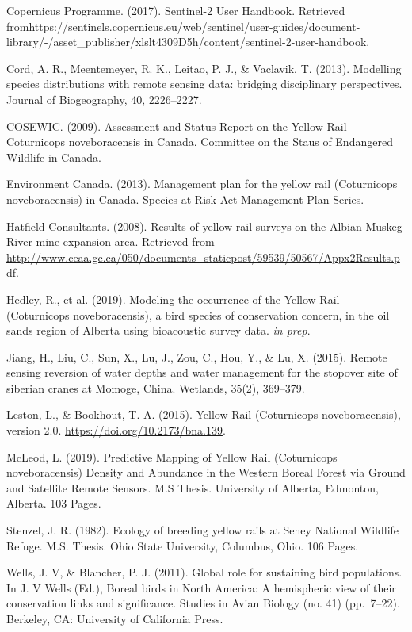 \documentclass[11pt,]{article}
\begin{document}
Copernicus Programme. (2017). Sentinel-2 User Handbook. Retrieved
fromhttps://sentinels.copernicus.eu/web/sentinel/user-guides/document-library/-/asset\_publisher/xlslt4309D5h/content/sentinel-2-user-handbook.

Cord, A. R., Meentemeyer, R. K., Leitao, P. J., \& Vaclavik, T. (2013).
Modelling species distributions with remote sensing data: bridging
disciplinary perspectives. Journal of Biogeography, 40, 2226--2227.

COSEWIC. (2009). Assessment and Status Report on the Yellow Rail
Coturnicops noveboracensis in Canada. Committee on the Staus of
Endangered Wildlife in Canada.

Environment Canada. (2013). Management plan for the yellow rail
(Coturnicops noveboracensis) in Canada. Species at Risk Act Management
Plan Series.

Hatfield Consultants. (2008). Results of yellow rail surveys on the
Albian Muskeg River mine expansion area. Retrieved from
\url{http://www.ceaa.gc.ca/050/documents_staticpost/59539/50567/Appx2Results.pdf}.

Hedley, R., et al. (2019). Modeling the occurrence of the Yellow Rail
(Coturnicops noveboracensis), a bird species of conservation concern, in
the oil sands region of Alberta using bioacoustic survey data. \emph{in
prep}.

Jiang, H., Liu, C., Sun, X., Lu, J., Zou, C., Hou, Y., \& Lu, X. (2015).
Remote sensing reversion of water depths and water management for the
stopover site of siberian cranes at Momoge, China. Wetlands, 35(2),
369--379.

Leston, L., \& Bookhout, T. A. (2015). Yellow Rail (Coturnicops
noveboracensis), version 2.0. \url{https://doi.org/10.2173/bna.139}.

McLeod, L. (2019). Predictive Mapping of Yellow Rail (Coturnicops
noveboracensis) Density and Abundance in the Western Boreal Forest via
Ground and Satellite Remote Sensors. M.S Thesis. University of Alberta,
Edmonton, Alberta. 103 Pages.

Stenzel, J. R. (1982). Ecology of breeding yellow rails at Seney
National Wildlife Refuge. M.S. Thesis. Ohio State University, Columbus,
Ohio. 106 Pages.

Wells, J. V, \& Blancher, P. J. (2011). Global role for sustaining bird
populations. In J. V Wells (Ed.), Boreal birds in North America: A
hemispheric view of their conservation links and significance. Studies
in Avian Biology (no. 41) (pp.~7--22). Berkeley, CA: University of
California Press.
\end{document}
